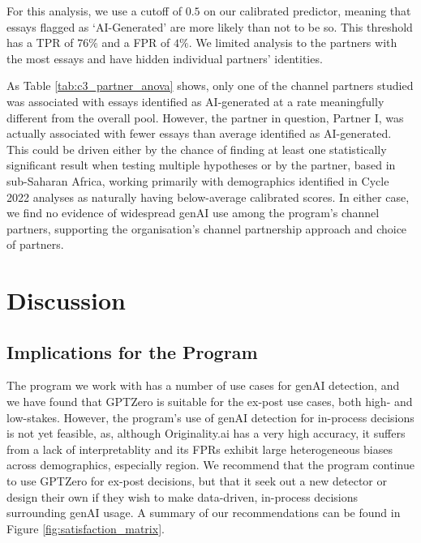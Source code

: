 For this analysis, we use a cutoff of $0.5$ on our calibrated predictor, meaning that essays flagged as `AI-Generated' are more likely than not to be so. This threshold has a TPR of $76\%$ and a FPR of $4\%$. We limited analysis to the partners with the most essays and have hidden individual partners' identities.

As Table \ref{tab:c3_partner_anova} shows, only one of the channel partners studied was associated with essays identified as AI-generated at a rate meaningfully different from the overall pool. However, the partner in question, Partner I, was actually associated with fewer essays than average identified as AI-generated. This could be driven either by the chance of finding at least one statistically significant result when testing multiple hypotheses or by the partner, based in sub-Saharan Africa, working primarily with demographics identified in Cycle 2022 analyses as naturally having below-average calibrated scores. In either case, we find no evidence of widespread genAI use among the program's channel partners, supporting the organisation's channel partnership approach and choice of partners.

\section{Discussion}\label{sec:disc}
\subsection{Implications for the Program}
The program we work with has a number of use cases for genAI detection, and we have found that GPTZero is suitable for the ex-post use cases, both high- and low-stakes. However, the program's use of genAI detection for in-process decisions is not yet feasible, as, although Originality.ai has a very high accuracy, it suffers from a lack of interpretablity and its FPRs exhibit large heterogeneous biases across demographics, especially region. We recommend that the program continue to use GPTZero for ex-post decisions, but that it seek out a new detector or design their own if they wish to make data-driven, in-process decisions surrounding genAI usage. A summary of our recommendations can be found in Figure \ref{fig:satisfaction_matrix}.

